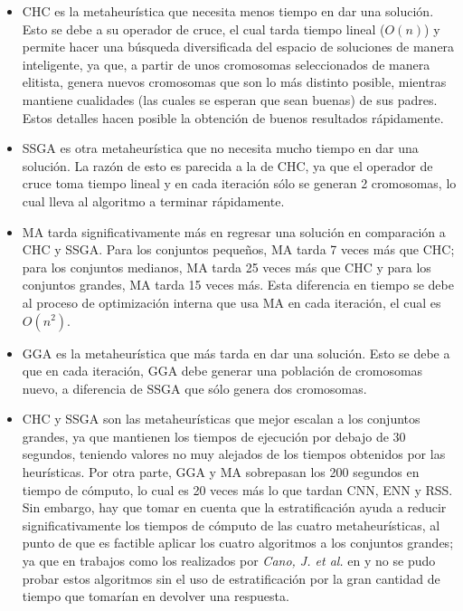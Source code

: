 \begin{itemize}

\item CHC es la metaheurística que necesita menos tiempo en dar una solución. Esto se debe a su operador de cruce, el cual tarda tiempo lineal ($O(n)$) y permite hacer una búsqueda diversificada del espacio de soluciones de manera inteligente, ya que, a partir de unos cromosomas seleccionados de manera elitista, genera nuevos cromosomas que son lo más distinto posible, mientras mantiene cualidades (las cuales se esperan que sean buenas) de sus padres. Estos detalles hacen posible la obtención de buenos resultados rápidamente.

\item SSGA es otra metaheurística que no necesita mucho tiempo en dar una solución. La razón de esto es parecida a la de CHC, ya que el operador de cruce toma tiempo lineal y en cada iteración sólo se generan 2 cromosomas, lo cual lleva al algoritmo a terminar rápidamente.

\item MA tarda significativamente más en regresar una solución en comparación a CHC y SSGA. Para los conjuntos pequeños, MA tarda 7 veces más que CHC; para los conjuntos medianos, MA tarda 25 veces más que CHC y para los conjuntos grandes, MA tarda 15 veces más. Esta diferencia en tiempo se debe al proceso de optimización interna que usa MA en cada iteración, el cual es $O(n^2)$.

\item GGA es la metaheurística que más tarda en dar una solución. Esto se debe a que en cada iteración, GGA debe generar una población de cromosomas nuevo, a diferencia de SSGA que sólo genera dos cromosomas.

\item CHC y SSGA son las metaheurísticas que mejor escalan a los conjuntos grandes, ya que mantienen los tiempos de ejecución por debajo de 30 segundos, teniendo valores no muy alejados de los tiempos obtenidos por las heurísticas. Por otra parte, GGA y MA sobrepasan los 200 segundos en tiempo de cómputo, lo cual es 20 veces más lo que tardan CNN, ENN y RSS. Sin embargo, hay que tomar en cuenta que la estratificación ayuda a reducir significativamente los tiempos de cómputo de las cuatro metaheurísticas, al punto de que es factible aplicar los cuatro algoritmos a los conjuntos grandes; ya que en trabajos como los realizados por \emph{Cano, J. et al.} en \cite{garcia2008memetic} y \cite{garcia2012prototype} no se pudo probar estos algoritmos sin el uso de estratificación por la gran cantidad de tiempo que tomarían en devolver una respuesta.

\end{itemize}


